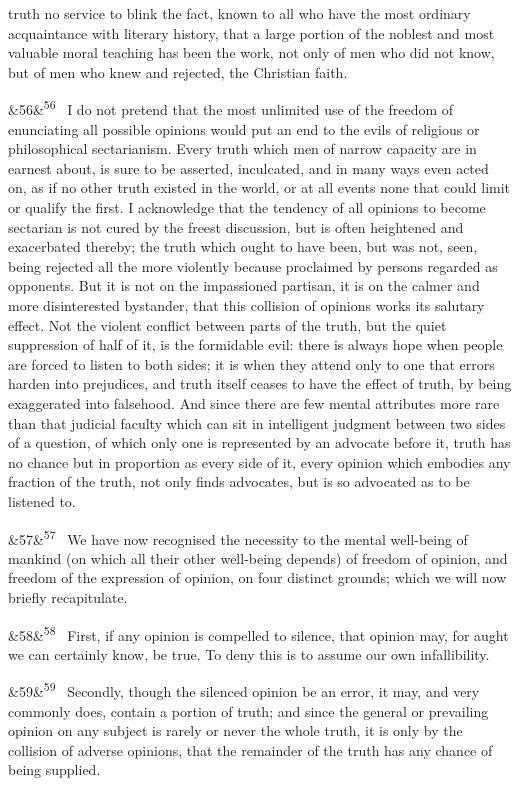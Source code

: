 \documentclass[12pt]{article}
\newcommand{\para}[1][]{\par\noindent\ifx&#1&\else\textsuperscript{\footnotesize #1}~\fi}
\begin{document}
truth no service to blink the fact, known to all who have the most ordinary acquaintance with literary history, that a large portion of the noblest and most valuable moral teaching has been the work, not only of men who did not know, but of men who knew and rejected, the Christian faith.

\para[56] I do not pretend that the most unlimited use of the freedom of enunciating all possible opinions would put an end to the evils of religious or philosophical sectarianism. Every truth which men of narrow capacity are in earnest about, is sure to be asserted, inculcated, and in many ways even acted on, as if no other truth existed in the world, or at all events none that could limit or qualify the first. I acknowledge that the tendency of all opinions to become sectarian is not cured by the freest discussion, but is often heightened and exacerbated thereby; the truth which ought to have been, but was not, seen, being rejected all the more violently because proclaimed by persons regarded as opponents. But it is not on the impassioned partisan, it is on the calmer and more disinterested bystander, that this collision of opinions works its salutary effect. Not the violent conflict between parts of the truth, but the quiet suppression of half of it, is the formidable evil: there is always hope when people are forced to listen to both sides; it is when they attend only to one that errors harden into prejudices, and truth itself ceases to have the effect of truth, by being exaggerated into falsehood. And since there are few mental attributes more rare than that judicial faculty which can sit in intelligent judgment between two sides of a question, of which only one is represented by an advocate before it, truth has no chance but in proportion as every side of it, every opinion which embodies any fraction of the truth, not only finds advocates, but is so advocated as to be listened to.

\para[57] We have now recognised the necessity to the mental well-being of mankind (on which all their other well-being depends) of freedom of opinion, and freedom of the expression of opinion, on four distinct grounds; which we will now briefly recapitulate.

\para[58] First, if any opinion is compelled to silence, that opinion may, for aught we can certainly know, be true. To deny this is to assume our own infallibility.

\para[59] Secondly, though the silenced opinion be an error, it may, and very commonly does, contain a portion of truth; and since the general or prevailing opinion on any subject is rarely or never the whole truth, it is only by the collision of adverse opinions, that the remainder of the truth has any chance of being supplied.
\end{document}
